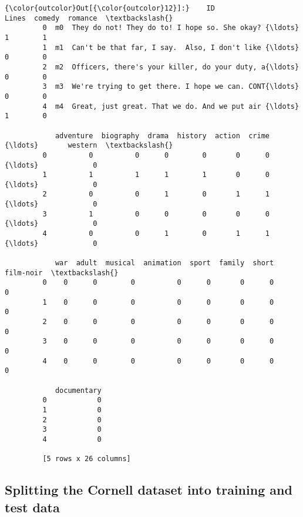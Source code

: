 \documentclass[11pt]{article}
\begin{document}
\begin{Verbatim}[commandchars=\\\{\}]
{\color{outcolor}Out[{\color{outcolor}12}]:}    ID                                              Lines  comedy  romance  \textbackslash{}
         0  m0  They do not! They do to! I hope so. She okay? {\ldots}       1        1   
         1  m1  Can't be that far, I say.  Also, I don't like {\ldots}       0        0   
         2  m2  Officers, there's your killer, do your duty, a{\ldots}       0        0   
         3  m3  We're trying to get there. I hope we can. CONT{\ldots}       0        0   
         4  m4  Great, just great. That we do. And we put air {\ldots}       1        0   
         
            adventure  biography  drama  history  action  crime     {\ldots}       western  \textbackslash{}
         0          0          0      0        0       0      0     {\ldots}             0   
         1          1          1      1        1       0      0     {\ldots}             0   
         2          0          0      1        0       1      1     {\ldots}             0   
         3          1          0      0        0       0      0     {\ldots}             0   
         4          0          0      1        0       1      1     {\ldots}             0   
         
            war  adult  musical  animation  sport  family  short  film-noir  \textbackslash{}
         0    0      0        0          0      0       0      0          0   
         1    0      0        0          0      0       0      0          0   
         2    0      0        0          0      0       0      0          0   
         3    0      0        0          0      0       0      0          0   
         4    0      0        0          0      0       0      0          0   
         
            documentary  
         0            0  
         1            0  
         2            0  
         3            0  
         4            0  
         
         [5 rows x 26 columns]
\end{Verbatim}
            
    \hypertarget{splitting-the-cornell-dataset-into-training-and-test-data}{%
\subsection{Splitting the Cornell dataset into training and test
data}\label{splitting-the-cornell-dataset-into-training-and-test-data}}
\end{document}

